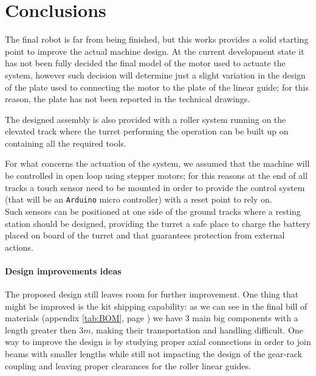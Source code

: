 \section{Conclusions}
	The final robot is far from being finished, but this works provides a solid starting point to improve the actual machine design. At the current development state it has not been fully decided the final model of the motor used to actuate the system, however such decision will determine just a slight variation in the design of the plate used to connecting the motor to the plate of the linear guide; for this reason, the plate has not been reported in the technical drawings.
	
	The designed assembly is also provided with a roller system running on the elevated track where the turret performing the operation can be built up on containing all the required tools.
	
	For what concerns the actuation of the system, we assumed that the machine will be controlled in open loop using stepper motors; for this reasons at the end of all tracks a touch sensor need to be mounted in order to provide the control system (that will be an \texttt{Arduino} micro controller) with a reset point to rely on. \\
	Such sensors can be positioned at one side of the ground tracks where a resting station should be designed, providing the turret a safe place to charge the battery placed on board of the turret and that guarantees protection from external actions.
	
	\paragraph{Design improvements ideas} The proposed design still leaves room for further improvement.
	One thing that might be improved is the kit shipping capability: as we can see in the final bill of materials (appendix \ref{tab:BOM}, page \pageref{tab:BOM}) we have 3 main big components with a length greater then $3m$, making their transportation and handling difficult. One way to improve the design is by studying proper axial connections in order to join beams with smaller lengths while still not impacting the design of the gear-rack coupling and leaving proper clearances for the roller linear guides.
	
	